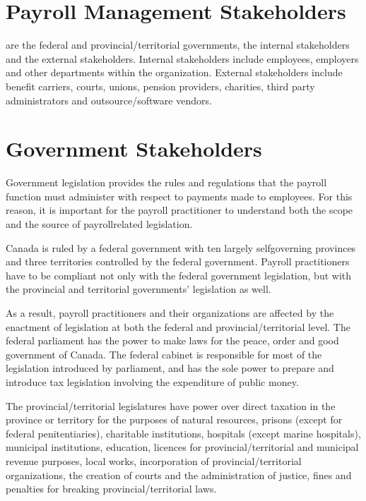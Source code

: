 \documentclass[letterpaper,10pt,english]{sphinxmanual}
\begin{document}
\section{Payroll Management Stakeholders}
\label{\detokenize{1_introduction:payroll-management-stakeholders}}
\sphinxAtStartPar
{} are the federal and provincial/territorial governments,
the internal stakeholders and the external stakeholders. Internal stakeholders
include employees, employers and other departments within the organization.
External stakeholders include benefit carriers, courts, unions, pension
providers, charities, third party administrators and outsource/software vendors.


\section{Government Stakeholders}
\label{\detokenize{1_introduction:government-stakeholders}}
\sphinxAtStartPar
Government legislation provides the rules and regulations that the payroll function must
administer with respect to payments made to employees. For this reason, it is important for
the payroll practitioner to understand both the scope and the source of payroll\sphinxhyphen{}related
legislation.

\sphinxAtStartPar
Canada is ruled by a federal government with ten largely self\sphinxhyphen{}governing provinces and three
territories controlled by the federal government. Payroll practitioners have to be compliant
not only with the federal government legislation, but with the provincial and territorial
governments’ legislation as well.

\sphinxAtStartPar
As a result, payroll practitioners and their organizations are affected by the enactment of
legislation at both the federal and provincial/territorial level.
The federal parliament has the power to make laws for the peace, order and good government
of Canada. The federal cabinet is responsible for most of the legislation introduced by
parliament, and has the sole power to prepare and introduce tax legislation involving the
expenditure of public money.

\sphinxAtStartPar
The provincial/territorial legislatures have power over direct taxation in the province or
territory for the purposes of natural resources, prisons (except for federal penitentiaries),
charitable institutions, hospitals (except marine hospitals), municipal institutions, education,
licences for provincial/territorial and municipal revenue purposes, local works, incorporation
of provincial/territorial organizations, the creation of courts and the administration of justice,
fines and penalties for breaking provincial/territorial laws.
\end{document}
